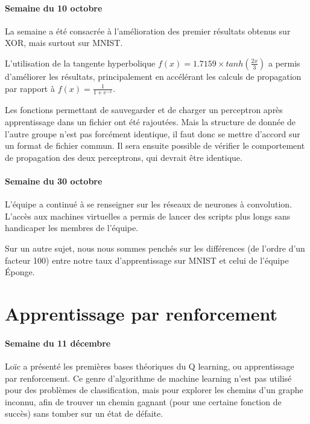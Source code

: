 \documentclass[
    10pt,
    a4paper,
    oneside,
    headinclude,footinclude,
    BCOR=5mm,
]{scrartcl}
\begin{document}
\paragraph{Semaine du 10 octobre}

La semaine a été consacrée à l'amélioration des premier résultats obtenus sur XOR, mais surtout sur MNIST.

L'utilisation de la tangente hyperbolique $f(x) = 1.7159 \times tanh(\frac{2x}{3})$ a permis d'améliorer les
résultats, principalement en accélérant les calculs de propagation par rapport à $f(x) = \frac{1}{1 + e^{-x}}$.

Les fonctions permettant de sauvegarder et de charger un perceptron après apprentissage dans un fichier ont été rajoutées.
Mais la structure de donnée de l'autre groupe n'est pas forcément identique, il faut donc se mettre d'accord sur un format de fichier commun.
Il sera ensuite possible de vérifier le comportement de propagation des deux perceptrons, qui devrait être identique.

\paragraph{Semaine du 30 octobre}

L'équipe a continué à se renseigner sur les réseaux de neurones à convolution. L'accès aux machines virtuelles a permis de lancer des scripts plus longs
sans handicaper les membres de l'équipe.

Sur un autre sujet, nous nous sommes penchés sur les différences (de l'ordre d'un facteur 100) entre notre taux d'apprentissage sur MNIST et celui de
l'équipe Éponge.

\section{Apprentissage par renforcement}

\paragraph{Semaine du 11 décembre}

Loïc a présenté les premières bases théoriques du Q learning, ou apprentissage par renforcement. Ce genre d'algorithme de machine learning n'est pas utilisé
pour des problèmes de classification, mais pour explorer les chemins d'un graphe inconnu, afin de trouver un chemin gagnant (pour une certaine fonction de succès)
sans tomber sur un état de défaite.

\renewcommand{\refname}{\spacedlowsmallcaps{References}} %

\end{document}
